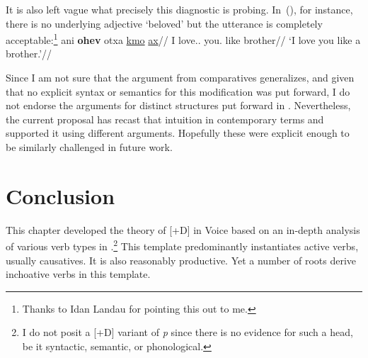 It is also left vague what precisely this diagnostic is probing. In~(\nextx), for instance, there is no underlying adjective `beloved' but the utterance is completely acceptable:\footnote{Thanks to Idan Landau for pointing this out to me.}
\ex
	\begingl
	\gla ani \textbf{ohev} otxa \underline{kmo} \underline{ax}//
	\glb I love.. you. like brother//
	\glft `I love you like a brother.'//
	\endgl
\xe


Since I am not sure that the argument from comparatives generalizes, and given that no explicit syntax or semantics for this modification was put forward, I do not endorse the arguments for distinct structures put forward in \cite{borer91}. Nevertheless, the current proposal has recast that intuition in contemporary terms and supported it using different arguments. Hopefully these were explicit enough to be similarly challenged in future work.


\section{Conclusion} \label{vd:sum}
This chapter developed the theory of [\!+\!D] in Voice based on an in-depth analysis of various verb types in {\thif}.\footnote{I do not posit a [\!+\!D] variant of \textit{p} since there is no evidence for such a head, be it syntactic, semantic, or phonological.} This template predominantly instantiates active verbs, usually causatives. It is also reasonably productive. Yet a number of roots derive inchoative verbs in this template.

